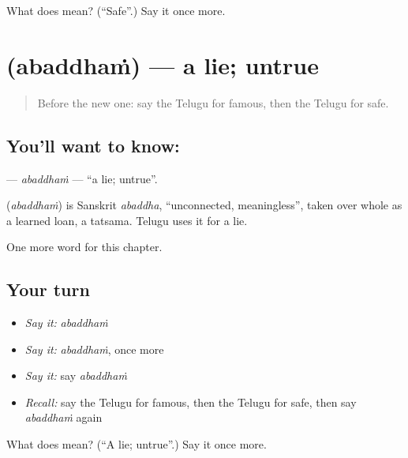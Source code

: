 \begin{tcolorbox}[breakable,colback=teal!4,colframe=teal!35!black,title={Before you move on}]
What does  mean? (\textquotedblleft{}Safe\textquotedblright{}.) Say it once more.
\end{tcolorbox}
\section[\texorpdfstring{\te{అబద్ధం} (abaddhaṁ)}{అబద్ధం (abaddhaṁ)}]{ (abaddhaṁ) — a lie; untrue}

\label{lesson:TE-C140-abaddham}



\begin{quote}
Before the new one: say the Telugu for famous, then the Telugu for safe.
\end{quote}

\subsection*{You'll want to know: }
\textbf{} — \emph{abaddhaṁ} — \textquotedblleft{}a lie; untrue\textquotedblright{}.

\begin{cousinweb}
\textbf{} (\emph{abaddhaṁ}) is Sanskrit \emph{abaddha}, \textquotedblleft{}unconnected, meaningless\textquotedblright{}, taken over whole as a learned loan, a tatsama. Telugu uses it for a lie.
\end{cousinweb}

\begin{grammarlens}[title={What you've built}]
One more word for this chapter.
\end{grammarlens}

\subsection*{Your turn}
\begin{itemize}
\raggedright
  \item \emph{Say it:} \emph{abaddhaṁ}
  \item \emph{Say it:} \emph{abaddhaṁ}, once more
  \item \emph{Say it:} say \emph{abaddhaṁ}
  \item \emph{Recall:} say the Telugu for famous, then the Telugu for safe, then say \emph{abaddhaṁ} again
\end{itemize}

\begin{tcolorbox}[breakable,colback=teal!4,colframe=teal!35!black,title={Before you move on}]
What does  mean? (\textquotedblleft{}A lie; untrue\textquotedblright{}.) Say it once more.
\end{tcolorbox}
